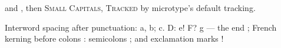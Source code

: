 \documentclass{article}
\begin{document}
 and , then
\textsc{Small Capitals, Tracked} by microtype's default tracking.

Interword spacing after punctuation: a, b; c. D: e! F? g --- the end ;
French kerning before colons : semicolons ; and exclamation marks !
\end{document}
